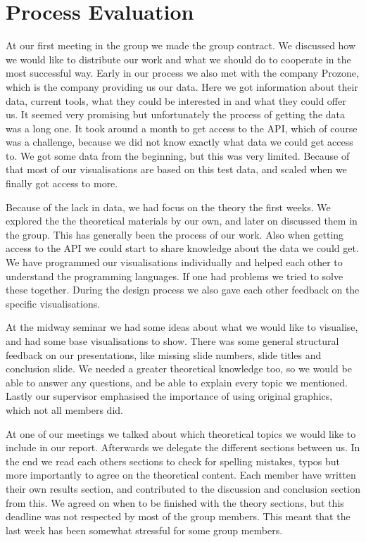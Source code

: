 \documentclass[Report.tex]{subfiles}
\begin{document}
\section*{Process Evaluation}
\pagestyle{empty}
At our first meeting in the group we made the group contract. We discussed how we would like to distribute our work and what we should do to cooperate in the most successful way. Early in our process we also met with the company Prozone, which is the company providing us our data. Here we got information about their data, current tools, what they could be interested in and what they could offer us. It seemed very promising but unfortunately the process of getting the data was a long one. It took around a month to get access to the API, which of course was a challenge, because we did not know exactly what data we could get access to. We got some data from the beginning, but this was very limited. Because of that most of our visualisations are based on this test data, and scaled when we finally got access to more.

Because of the lack in data, we had focus on the theory the first weeks. We explored the the theoretical materials by our own, and later on discussed them in the group. This has generally been the process of our work. Also when getting access to the API we could start to share knowledge about the data we could get. We have programmed our visualisations individually and helped each other to understand the programming languages. If one had problems we tried to solve these together. During the design process we also gave each other feedback on the specific visualisations. 

At the midway seminar we had some ideas about what we would like to visualise, and had some base visualisations to show. There was some general structural feedback on our presentations, like missing slide numbers, slide titles and conclusion slide. We needed a greater theoretical knowledge too, so we would be able to answer any questions, and be able to explain every topic we mentioned. Lastly our supervisor emphasised the importance of using original graphics, which not all members did.

At one of our meetings we talked about which theoretical topics we would like to include in our report. Afterwards we delegate the different sections between us.  In the end we read each others sections to check for spelling mistakes, typos but more importantly to agree on the theoretical content. Each member have written their own results section, and contributed to the discussion and conclusion section from this. We agreed on when to be finished with the theory sections, but this deadline was not respected by most of the group members. This meant that the last week has been somewhat stressful for some group members.
\end{document}
